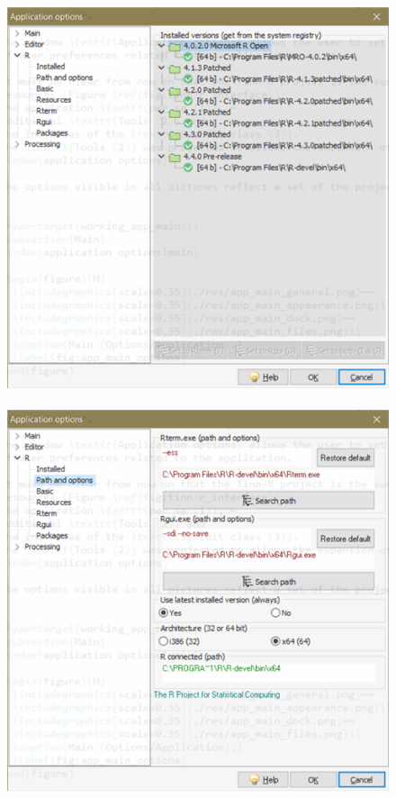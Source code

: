 \begin{figure}[h!]
  \includegraphics[scale=0.6]{./res/app_r_installed.png}~~
  \includegraphics[scale=0.6]{./res/app_r_pathandoptions.png}\\

\end{figure}
